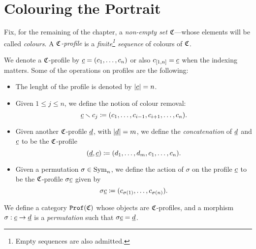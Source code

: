 \section{Colouring the Portrait}

\begin{definition}
    \label{def:colors-profiles}
    Fix, for the remaining of the chapter, a \emph{non-empty set} \(\mathfrak{C}\)---whose
    elements will be called \emph{colours}. A \emph{\(\mathfrak{C}\)-profile} is a
    \emph{finite\footnote{Empty sequences are also admitted.} sequence} of colours of
    \(\mathfrak{C}\).
\end{definition}

\begin{notation}
    \label{not:profiles-and-operations}
    We denote a \(\mathfrak{C}\)-profile by \(\underline{c} = (c_1, \dots, c_n)\) or also
    \(c_{[1, n]} = \underline{c}\) when the indexing matters. Some of the operations on
    profiles are the following:
    \begin{itemize}\setlength\itemsep{0em}
        \item The lenght of the profile is denoted by \(|\underline{c}| = n\).
        \item Given \(1 \leq j \leq n\), we define the notion of colour removal:
              \[
                  \underline{c} \smallsetminus c_j \coloneq (c_1, \dots, c_{i-1}, c_{i+1}, \dots, c_n).
              \]
        \item Given another \(\mathfrak{C}\)-profile \(\underline{d}\), with \(|\underline{d}| = m\), we
              define the \emph{concatenation} of \(\underline{d}\) and \(\underline{c}\) to be the
              \(\mathfrak{C}\)-profile
              \[
                  (\underline{d}, \underline{c}) \coloneq (d_1, \dots, d_m, c_1, \dots, c_n).
              \]
        \item Given a permutation \(\sigma \in \operatorname{Sym}_n\), we define the action of
              \(\sigma\) on the profile \(\underline{c}\) to be the \(\mathfrak{C}\)-profile \(\sigma
              \underline{c}\) given by
              \[
                  \sigma \underline{c} \coloneq (c_{\sigma(1)}, \dots, c_{\sigma(n)}).
              \]
    \end{itemize}
\end{notation}

\begin{definition}
    \label{def:profile-category}
    We define a category \({\texttt{Prof}(\mathfrak{C})}\) whose objects are \(\mathfrak{C}\)-profiles, and a
    morphism \(\sigma: \underline{c} \to \underline{d}\) is a \emph{permutation} such that
    \(\sigma \underline{c} = \underline{d}\).
\end{definition}

